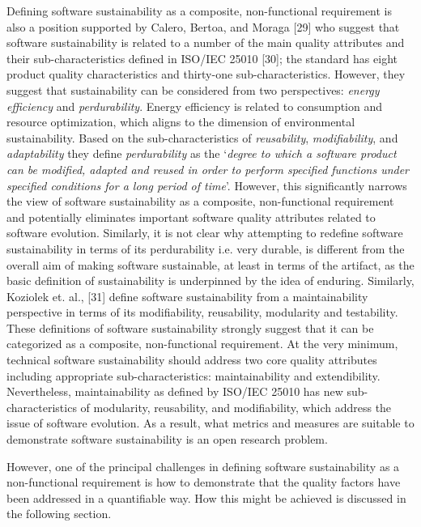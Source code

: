 \documentclass[preprint,12pt,authoryear]{elsarticle}
\begin{document}
Defining software sustainability as a composite, non-functional
requirement is also a position supported by Calero, Bertoa, and Moraga
[29] who suggest that software sustainability is related to a number
of the main quality attributes and their sub-characteristics defined
in ISO/IEC 25010 [30]; the standard has eight product quality
characteristics and thirty-one sub-characteristics. However, they
suggest that sustainability can be considered from two perspectives:
{\emph{energy efficiency}} and {\emph{perdurability}}. Energy
efficiency is related to consumption and resource optimization, which
aligns to the dimension of environmental sustainability. Based on the
sub-characteristics of {\emph{reusability}}, {\emph{modifiability}},
and {\emph{adaptability}} they define {\emph{perdurability}} as the
`{\emph{degree to which a software product can be modified, adapted
and reused in order to perform specified functions under specified
conditions for a long period of time}}'. However, this significantly
narrows the view of software sustainability as a composite,
non-functional requirement and potentially eliminates important
software quality attributes related to software evolution. Similarly,
it is not clear why attempting to redefine software sustainability in
terms of its perdurability i.e. very durable, is different from the
overall aim of making software sustainable, at least in terms of the
artifact, as the basic definition of sustainability is underpinned by
the idea of enduring. Similarly, Koziolek et. al., [31] define
software sustainability from a maintainability perspective in terms of
its modifiability, reusability, modularity and testability. These
definitions of software sustainability strongly suggest that it can be
categorized as a composite, non-functional requirement. At the very
minimum, technical software sustainability should address two core
quality attributes including appropriate sub-characteristics:
maintainability and extendibility. Nevertheless, maintainability as
defined by ISO/IEC 25010 has new sub-characteristics of modularity,
reusability, and modifiability, which address the issue of software
evolution. As a result, what metrics and measures are suitable to
demonstrate software sustainability is an open research problem.

However, one of the principal challenges in defining software
sustainability as a non-functional requirement is how to demonstrate
that the quality factors have been addressed in a quantifiable
way. How this might be achieved is discussed in the following section.
\end{document}
